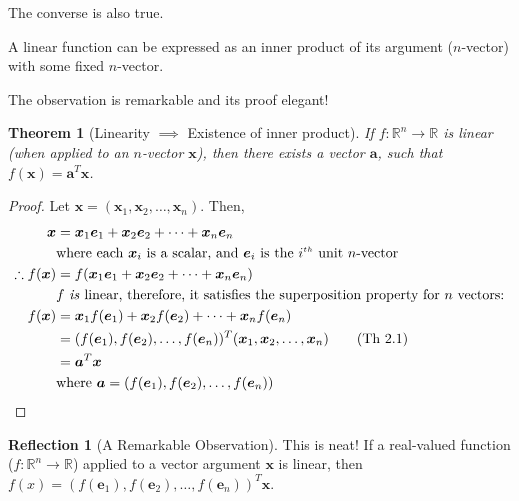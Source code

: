 \documentclass[11pt]{book}
\theoremstyle{definition}
\theoremstyle{plain}
\newtheorem{theorem}{Theorem}
\theoremstyle{problemstyle}
\theoremstyle{remark}
\theoremstyle{definition}
\newtheorem{reflection}{Reflection}
\begin{document}
The converse is also true.

A linear function can be expressed as an inner product of its argument ($n$-vector) with some fixed $n$-vector.

The observation is remarkable and its proof elegant!

\begin{theorem}[Linearity $\implies$ Existence of inner product]
    \label{th:linearity->inner-product}
    If $f:\mathbb{R}^n\rightarrow\mathbb{R}$ is linear (when applied to an $n$-vector $\boldsymbol{x}$), then there exists a vector $\boldsymbol{a}$, such that $f(\boldsymbol{x})=\boldsymbol{a}^T\boldsymbol{x}$.
\end{theorem}
\begin{proof}
    Let $\boldsymbol{x}=(\boldsymbol{x}_1,\boldsymbol{x}_2,\dots,\boldsymbol{x}_n)$.
    Then,
    \begin{align*}
        \label{eq:Th 2.1}
            \boldsymbol{x}&=\boldsymbol{x}_1\boldsymbol{e}_1+\boldsymbol{x}_2\boldsymbol{e}_2+\dots+\boldsymbol{x}_n\boldsymbol{e}_n\\
            &\text{where each $\boldsymbol{x}_i$ is a scalar, and $\boldsymbol{e}_i$ is the $i^{\scriptscriptstyle th}$ unit $n$-vector}\\
            \therefore f(\boldsymbol{x})&=f(\boldsymbol{x}_1\boldsymbol{e}_1+\boldsymbol{x}_2\boldsymbol{e}_2+\dots+\boldsymbol{x}_n\boldsymbol{e}_n)\\
            &\text{$f$ \emph{is} linear, therefore, it satisfies the superposition property for $n$ vectors:}\\
            f(\boldsymbol{x})&=\boldsymbol{x}_1f(\boldsymbol{e}_1)+\boldsymbol{x}_2f(\boldsymbol{e}_2)+\dots+\boldsymbol{x}_nf(\boldsymbol{e}_n)\\
                &=(f(\boldsymbol{e}_1),f(\boldsymbol{e}_2),\dots,f(\boldsymbol{e}_n))^T(\boldsymbol{x}_1,\boldsymbol{x}_2,\dots,\boldsymbol{x}_n) \tag{Th 2.1}\\
                &=\boldsymbol{a}^T\boldsymbol{x}\\
                &\text{where $\boldsymbol{a}=(f(\boldsymbol{e}_1),f(\boldsymbol{e}_2),\dots,f(\boldsymbol{e}_n))$} 
    \end{align*}
\end{proof}

\begin{reflection}[A Remarkable Observation]
    This is neat! If a real-valued function ($f:\mathbb{R}^n\rightarrow\mathbb{R}$) applied to a vector argument $\boldsymbol{x}$ is linear, then $f(x)=(f(\boldsymbol{e}_1),f(\boldsymbol{e}_2),\dots,f(\boldsymbol{e}_n))^T\boldsymbol{x}$.
\end{reflection}
\end{document}
